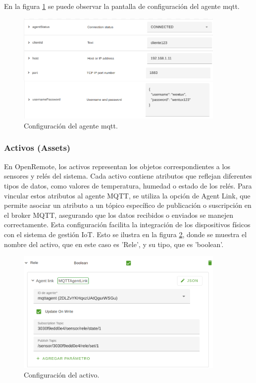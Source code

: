 En la figura \ref{fig:conf_mqtt} se puede observar la pantalla de configuración del agente mqtt.

\begin{figure}[H]
\centering 
\includegraphics[width=0.9\textwidth]{./Figures/conf_mqtt.png}
\caption{Configuración del agente mqtt.}
\label{fig:conf_mqtt}
\end{figure}

\subsubsection{Activos (Assets)}

En OpenRemote, los activos representan los objetos correspondientes a los sensores y relés del sistema. Cada activo contiene atributos que reflejan diferentes tipos de datos, como valores de temperatura, humedad o estado de los relés. Para vincular estos atributos al agente MQTT, se utiliza la opción de Agent Link, que permite asociar un atributo a un tópico específico de publicación o suscripción en el broker MQTT, asegurando que los datos recibidos o enviados se manejen correctamente. Esta configuración facilita la integración de los dispositivos físicos con el sistema de gestión IoT. Esto se ilustra en la figura \ref{fig:activo_conf}, donde se muestra el nombre del activo, que en este caso es 'Rele', y su tipo, que es 'boolean'.

\begin{figure}[H]
\centering 
\includegraphics[width=0.9\textwidth]{./Figures/activo_conf.png}
\caption{Configuración del activo.}
\label{fig:activo_conf}
\end{figure}

